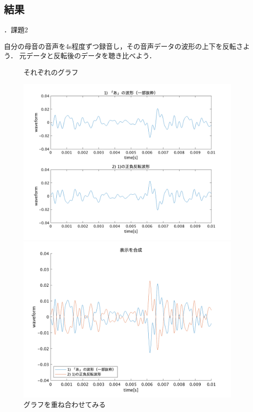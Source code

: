\documentclass[aspectratio=43]{beamer}
\newcommand{\showsec}{\thesection ．}
\begin{document}
\subsection{結果}
\begin{frame}[t]{\showsec 課題2}
    \begin{exampleblock}{}
        自分の母音の音声を4s程度ずつ録音し，その音声データの波形の上下を反転さよう．
        元データと反転後のデータを聴き比べよう．
    \end{exampleblock}
    \begin{figure}
        \centering
        \begin{minipage}[t]{0.49\textwidth}
            \centering
            \caption{それぞれのグラフ}
            \includegraphics[keepaspectratio,width=\textwidth]{no2_ans_1.png}
        \end{minipage}
        \begin{minipage}[t]{0.49\textwidth}
            \centering
            \caption{グラフを重ね合わせてみる}
            \includegraphics[keepaspectratio,width=\textwidth]{no2_ans_2.png}
        \end{minipage}
    \end{figure}
\end{frame}
\end{document}
